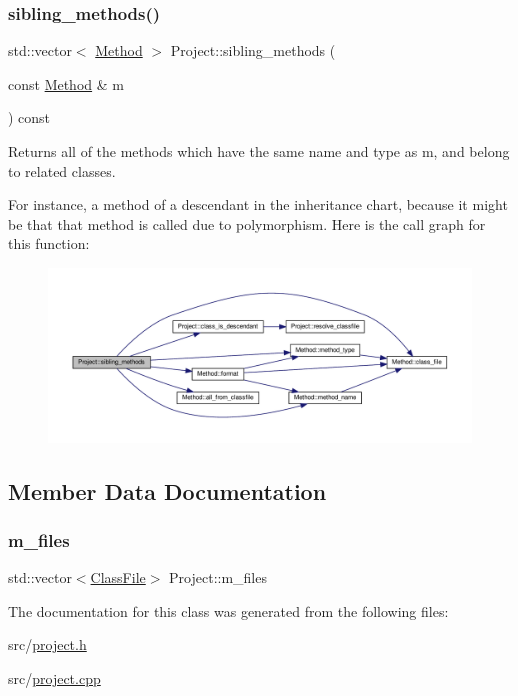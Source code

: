 \subsubsection{\texorpdfstring{sibling\+\_\+methods()}{sibling\_methods()}}
{\footnotesize\ttfamily std\+::vector$<$ \hyperlink{classMethod}{Method} $>$ Project\+::sibling\+\_\+methods (\begin{DoxyParamCaption}\item[{const \hyperlink{classMethod}{Method} \&}]{m }\end{DoxyParamCaption}) const}

Returns all of the methods which have the same name and type as {\ttfamily m}, and belong to related classes.

For instance, a method of a descendant in the inheritance chart, because it might be that that method is called due to polymorphism. Here is the call graph for this function\+:
\nopagebreak
\begin{figure}[H]
\begin{center}
\leavevmode
\includegraphics[width=350pt]{classProject_afee58125bfee1c7a1871be7805e855fa_cgraph}
\end{center}
\end{figure}


\subsection{Member Data Documentation}
\mbox{\label{classProject_a33de2bfb90183333d5e7c422bc5d6396}} 
\subsubsection{\texorpdfstring{m\+\_\+files}{m\_files}}
{\footnotesize\ttfamily std\+::vector$<$\hyperlink{classfile_8h_a00b46b60bc40e813e9fb1bb049174346}{Class\+File}$>$ Project\+::m\+\_\+files\hspace{0.3cm}{\ttfamily [private]}}



The documentation for this class was generated from the following files\+:\begin{DoxyCompactItemize}
\item 
src/\hyperlink{project_8h}{project.\+h}\item 
src/\hyperlink{project_8cpp}{project.\+cpp}\end{DoxyCompactItemize}
